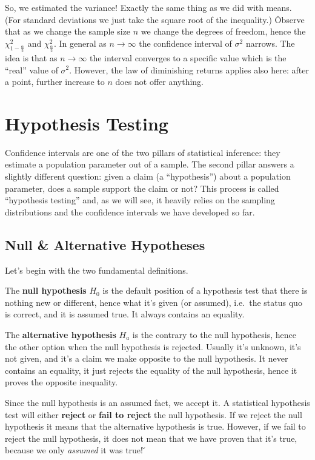 So, we estimated the variance! Exactly the same thing as we did with means. (For standard deviations we just take
the square root of the inequality.) \v

Observe that as we change the sample size $n$ we change the degrees of freedom, hence the
$\chi^{2}_{1 - \frac{\alpha}{2}}$ and $\chi^{2}_{\frac{\alpha}{2}}$. In general as $n \to \infty$ the confidence
interval of $\sigma^{2}$ narrows. The idea is that as $n \to \infty$ the interval converges to a specific value
which is the ``real'' value of $\sigma^{2}$. However, the law of diminishing returns applies also here: after a
point, further increase to $n$ does not offer anything.

\section{Hypothesis Testing}

Confidence intervals are one of the two pillars of statistical inference: they estimate a population parameter out
of a sample. The second pillar answers a slightly different question: given a claim (a ``hypothesis'') about a
population parameter, does a sample support the claim or not? This process is called ``hypothesis testing'' and, as
we will see, it heavily relies on the sampling distributions and the confidence intervals we have developed so far.

\subsection{Null \& Alternative Hypotheses}

Let's begin with the two fundamental definitions.

The \textbf{null hypothesis} $H_{0}$ is the default position of a hypothesis test that there is nothing new or
different, hence what it's given (or assumed), i.e.\ the status quo is correct, and it is assumed true. It always
contains an equality.
\ed

The \textbf{alternative hypothesis} $H_{a}$ is the contrary to the null hypothesis, hence the other option when the
null hypothesis is rejected. Usually it's unknown, it's not given, and it's a claim we make opposite to the null
hypothesis. It never contains an equality, it just rejects the equality of the null hypothesis, hence it proves the
opposite inequality.
\ed

Since the null hypothesis is an assumed fact, we accept it. A statistical hypothesis test will either
\textbf{reject} or \textbf{fail to reject} the null hypothesis. If we reject the null hypothesis it means that the
alternative hypothesis is true. However, if we fail to reject the null hypothesis, it does not mean that we have
proven that it's true, because we only \emph{assumed} it was true! \v

